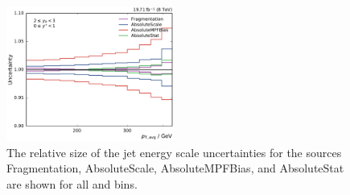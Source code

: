 \begin{figure}[htbp]
    \includegraphics[width=0.49\textwidth]{figures/measurement/jec_relunc_0_yb2ys0.pdf}
    \caption[Split-up of JEC uncertainty sources: Part I]{The relative size of the jet energy scale
             uncertainties for the sources Fragmentation, AbsoluteScale,
             AbsoluteMPFBias,
             and AbsoluteStat are shown for all \ystar and \yboost bins.}
\label{fig:jec_relunc_0}
\end{figure}

